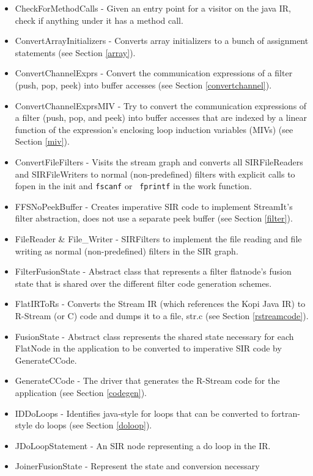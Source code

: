 \documentclass[10pt, letterpaper, onecolumn]{article}
\begin{document}
\begin{itemize}
\item CheckForMethodCalls -  Given an entry point for a visitor on the java
IR, check if anything under it has a method call.
\item ConvertArrayInitializers - Converts array initializers to a bunch of
assignment statements (see Section \ref{array}). 
\item ConvertChannelExprs - Convert the communication expressions of a
filter (push, pop, peek) into buffer accesses (see Section \ref{convertchannel}). 
\item ConvertChannelExprsMIV  - Try to convert the communication expressions
of a filter (push, pop, and peek) into buffer accesses that are
indexed by a linear function of the expression's enclosing loop
induction variables (MIVs) (see Section \ref{miv}). 
\item ConvertFileFilters - Visits the stream graph and converts all
SIRFileReaders and SIRFileWriters to normal (non-predefined) filters
with explicit calls to fopen in the init and {\tt fscanf} or {\tt
fprintf} in the work function.
\item FFSNoPeekBuffer -  Creates imperative SIR code to implement
  StreamIt's filter abstraction, does not use a separate peek buffer
  (see Section \ref{filter}).
\item FileReader \& File\_Writer  - SIRFilters to implement the file
  reading and file writing as normal (non-predefined) filters in the
  SIR graph.
\item FilterFusionState - Abstract class that represents a filter
flatnode's fusion state that is shared over the different filter code
generation schemes.
\item FlatIRToRs - Converts the Stream IR (which references the Kopi
Java IR) to R-Stream (or C) code and dumps it to a file, str.c (see
Section \ref{rstreamcode}).
\item FusionState - Abstract class represents the shared state
necessary for each FlatNode in the application to be converted to
imperative SIR code by GenerateCCode.
\item GenerateCCode - The driver that generates the R-Stream code for the
  application (see Section \ref{codegen}).
\item IDDoLoops - Identifies java-style for loops that can be
converted to fortran-style do loops (see Section \ref{doloop}).
\item JDoLoopStatement - An SIR node representing a do loop in the IR.
\item JoinerFusionState - Represent the state and conversion necessary

\end{itemize}
\end{document}
